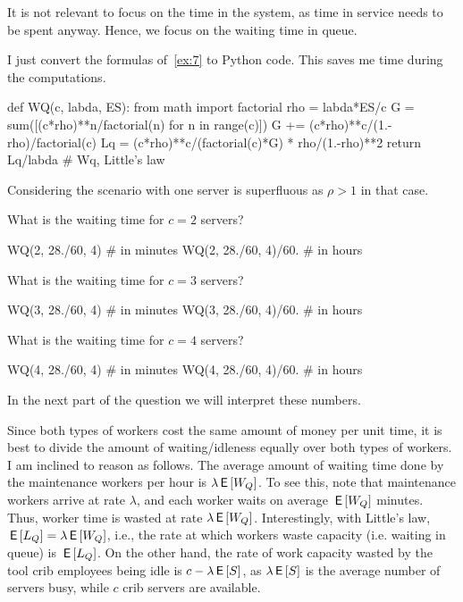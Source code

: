 \begin{exercise}[Hall 5.10]
\begin{solution}
It is not relevant to focus on the time in the system, as time
  in service needs to be spent anyway. Hence, we focus on the waiting
  time in queue.


I just convert the formulas of~\cref{ex:7} to Python code. This saves
me time during the computations.

\begin{pyconsole}
  
def WQ(c, labda, ES):
    from math import factorial
    rho = labda*ES/c
    G = sum([(c*rho)**n/factorial(n) for n in range(c)])
    G += (c*rho)**c/(1.-rho)/factorial(c)
    Lq = (c*rho)**c/(factorial(c)*G) * rho/(1.-rho)**2
    return Lq/labda # Wq, Little's law

\end{pyconsole} 

Considering the scenario with one server is superfluous as $\rho>1$ in
that case.

What is the waiting time for $c=2$ servers?

\begin{pyconsole}
WQ(2, 28./60, 4) # in minutes
WQ(2, 28./60, 4)/60. # in hours
\end{pyconsole}

What is the waiting time for $c=3$ servers?

\begin{pyconsole}
WQ(3, 28./60, 4)   # in minutes
WQ(3, 28./60, 4)/60. # in hours
\end{pyconsole}


What is the waiting time for $c=4$ servers?

\begin{pyconsole}
WQ(4, 28./60, 4) # in minutes
WQ(4, 28./60, 4)/60. # in hours
\end{pyconsole} 

In the next  part of the question we will interpret these numbers.

Since both types of workers cost the same amount of money per unit
time, it is best to divide the amount of waiting/idleness equally over
both types of workers.  I am inclined to reason as follows. The
average amount of waiting time done by the maintenance workers per
hour is $\lambda \,\mathsf{E}\left[W_Q\right]$. To see this, note that maintenance workers arrive at rate $\lambda$, and each worker waits on average $\,\mathsf{E}\left[W_Q\right]$ minutes. Thus, worker time is wasted at rate $\lambda \,\mathsf{E}\left[W_Q\right]$. Interestingly, with Little's law, $\,\mathsf{E}\left[L_Q\right]=\lambda \,\mathsf{E}\left[W_Q\right]$, i.e., the rate at which workers waste capacity (i.e.  waiting in queue) is $\,\mathsf{E}\left[L_Q\right]$. On the other hand, the  rate of work capacity wasted by the tool crib employees being idle is $c-\lambda \,\mathsf{E}\left[S\right]$, as $\lambda \,\mathsf{E}\left[S\right]$ is the average number of servers busy, while $c$ crib servers are available.


\end{solution}
\end{exercise}
